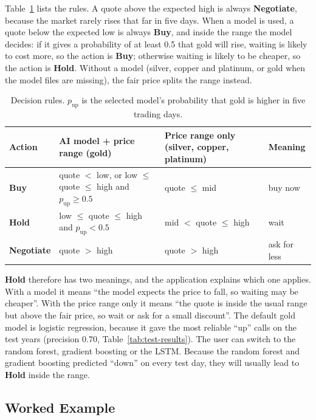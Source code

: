 Table~\ref{tab:decision-rules} lists the rules. A quote above the expected
high is always \textbf{Negotiate}, because the market rarely rises that far
in five days. When a model is used, a quote below the expected low is always
\textbf{Buy}, and inside the range the model decides: if it gives a
probability of at least 0.5 that gold will rise, waiting is likely to cost
more, so the action is \textbf{Buy}; otherwise waiting is likely to be
cheaper, so the action is \textbf{Hold}. Without a model (silver, copper and
platinum, or gold when the model files are missing), the fair price splits
the range instead.

\begin{table}[H]
  \centering
  \small
  \begin{tabular}{p{2.6cm}p{4.6cm}p{4.6cm}p{1.9cm}}
    \toprule
    Action & AI model + price range (gold) & Price range only (silver, copper, platinum) & Meaning \\
    \midrule
    \textbf{Buy} & quote $<$ low, or low $\le$ quote $\le$ high and $p_{\text{up}} \ge 0.5$ & quote $\le$ mid & buy now \\
    \textbf{Hold} & low $\le$ quote $\le$ high and $p_{\text{up}} < 0.5$ & mid $<$ quote $\le$ high & wait \\
    \textbf{Negotiate} & quote $>$ high & quote $>$ high & ask for less \\
    \bottomrule
  \end{tabular}
  \caption{Decision rules. $p_{\text{up}}$ is the selected model's probability that gold is higher in five trading days.}
  \label{tab:decision-rules}
\end{table}

\textbf{Hold} therefore has two meanings, and the application explains which
one applies. With a model it means ``the model expects the price to fall, so
waiting may be cheaper''. With the price range only it means ``the quote is
inside the usual range but above the fair price, so wait or ask for a small
discount''. The default gold model is logistic regression, because it gave
the most reliable ``up'' calls on the test years (precision 0.70,
Table~\ref{tab:test-results}). The user can switch to the random forest,
gradient boosting or the LSTM. Because the random forest and gradient
boosting predicted ``down'' on every test day, they will usually lead to
\textbf{Hold} inside the range.

\subsection{Worked Example}

